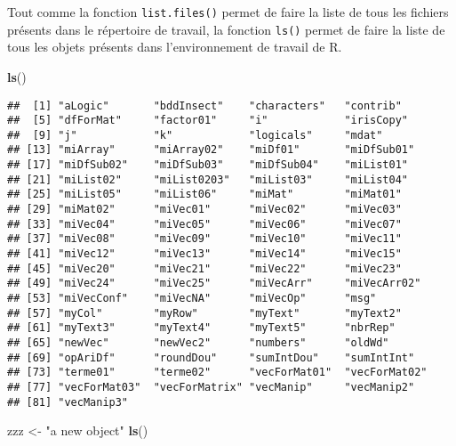 \documentclass[]{book}
\newenvironment{Shaded}{\begin{snugshade}}{\end{snugshade}}
\newcommand{\KeywordTok}[1]{\textcolor[rgb]{0.13,0.29,0.53}{\textbf{#1}}}
\newcommand{\StringTok}[1]{\textcolor[rgb]{0.31,0.60,0.02}{#1}}
\newcommand{\NormalTok}[1]{#1}
\theoremstyle{definition}
\theoremstyle{definition}
\theoremstyle{definition}
\theoremstyle{remark}
\begin{document}
Tout comme la fonction \texttt{list.files()} permet de faire la liste de
tous les fichiers présents dans le répertoire de travail, la fonction
\texttt{ls()} permet de faire la liste de tous les objets présents dans
l'environnement de travail de R.

\begin{Shaded}
\begin{Highlighting}[]
\KeywordTok{ls}\NormalTok{()}
\end{Highlighting}
\end{Shaded}

\begin{verbatim}
##  [1] "aLogic"       "bddInsect"    "characters"   "contrib"     
##  [5] "dfForMat"     "factor01"     "i"            "irisCopy"    
##  [9] "j"            "k"            "logicals"     "mdat"        
## [13] "miArray"      "miArray02"    "miDf01"       "miDfSub01"   
## [17] "miDfSub02"    "miDfSub03"    "miDfSub04"    "miList01"    
## [21] "miList02"     "miList0203"   "miList03"     "miList04"    
## [25] "miList05"     "miList06"     "miMat"        "miMat01"     
## [29] "miMat02"      "miVec01"      "miVec02"      "miVec03"     
## [33] "miVec04"      "miVec05"      "miVec06"      "miVec07"     
## [37] "miVec08"      "miVec09"      "miVec10"      "miVec11"     
## [41] "miVec12"      "miVec13"      "miVec14"      "miVec15"     
## [45] "miVec20"      "miVec21"      "miVec22"      "miVec23"     
## [49] "miVec24"      "miVec25"      "miVecArr"     "miVecArr02"  
## [53] "miVecConf"    "miVecNA"      "miVecOp"      "msg"         
## [57] "myCol"        "myRow"        "myText"       "myText2"     
## [61] "myText3"      "myText4"      "myText5"      "nbrRep"      
## [65] "newVec"       "newVec2"      "numbers"      "oldWd"       
## [69] "opAriDf"      "roundDou"     "sumIntDou"    "sumIntInt"   
## [73] "terme01"      "terme02"      "vecForMat01"  "vecForMat02" 
## [77] "vecForMat03"  "vecForMatrix" "vecManip"     "vecManip2"   
## [81] "vecManip3"
\end{verbatim}

\begin{Shaded}
\begin{Highlighting}[]
\NormalTok{zzz <-}\StringTok{ "a new object"}
\KeywordTok{ls}\NormalTok{()}
\end{Highlighting}
\end{Shaded}
\end{document}
